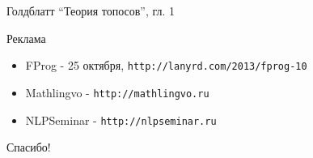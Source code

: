 \documentclass{beamer}
\begin{document}
\begin{frame}{Голдблатт ``Теория топосов'', гл. 1}
\end{frame}

\begin{frame}{Реклама}
  \begin{itemize}
    \item FProg - 25 октября, \texttt{http://lanyrd.com/2013/fprog-10}
    \item Mathlingvo - \texttt{http://mathlingvo.ru}
    \item NLPSeminar - \texttt{http://nlpseminar.ru}
  \end{itemize}
\end{frame}


\begin{frame}{}
    \thispagestyle{empty}
    \begin{center}
        {\large Спасибо!}
    \end{center}
\end{frame}


\end{document}
